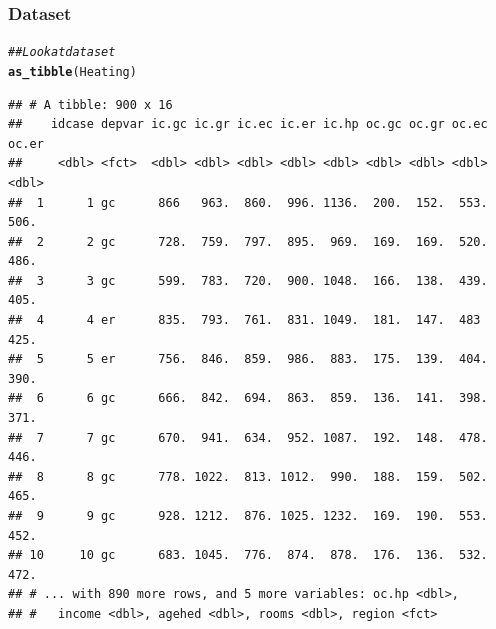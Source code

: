 \documentclass{beamer}\usepackage[]{graphicx}\usepackage[]{color}
\makeatletter
\newcommand{\hlstr}[1]{\textcolor[rgb]{0.192,0.494,0.8}{#1}}%
\newcommand{\hlcom}[1]{\textcolor[rgb]{0.678,0.584,0.686}{\textit{#1}}}%
\newcommand{\hlopt}[1]{\textcolor[rgb]{0,0,0}{#1}}%
\newcommand{\hlstd}[1]{\textcolor[rgb]{0.345,0.345,0.345}{#1}}%
\newcommand{\hlkwb}[1]{\textcolor[rgb]{0.69,0.353,0.396}{#1}}%
\newcommand{\hlkwc}[1]{\textcolor[rgb]{0.333,0.667,0.333}{#1}}%
\newcommand{\hlkwd}[1]{\textcolor[rgb]{0.737,0.353,0.396}{\textbf{#1}}}%
\newenvironment{kframe}{%
 \def\at@end@of@kframe{}%
 \ifinner\ifhmode%
  \def\at@end@of@kframe{\end{minipage}}%
  \begin{minipage}{\columnwidth}%
 \fi\fi%
 \def\FrameCommand##1{\hskip\@totalleftmargin \hskip-\fboxsep
 \colorbox{shadecolor}{##1}\hskip-\fboxsep
     \hskip-\linewidth \hskip-\@totalleftmargin \hskip\columnwidth}%
 \MakeFramed {\advance\hsize-\width
   \@totalleftmargin\z@ \linewidth\hsize
   \@setminipage}}%
 {\par\unskip\endMakeFramed%
 \at@end@of@kframe}
\newenvironment{knitrout}{}{} %
\makeatother
\begin{document}
\begin{frame}[fragile]\frametitle{Dataset}
\begin{knitrout}\footnotesize
{}\color{fgcolor}\begin{kframe}
\begin{alltt}
\hlcom{## Look at dataset}
\hlkwd{as_tibble}\hlstd{(Heating)}
\end{alltt}
\begin{verbatim}
## # A tibble: 900 x 16
##    idcase depvar ic.gc ic.gr ic.ec ic.er ic.hp oc.gc oc.gr oc.ec oc.er
##     <dbl> <fct>  <dbl> <dbl> <dbl> <dbl> <dbl> <dbl> <dbl> <dbl> <dbl>
##  1      1 gc      866   963.  860.  996. 1136.  200.  152.  553.  506.
##  2      2 gc      728.  759.  797.  895.  969.  169.  169.  520.  486.
##  3      3 gc      599.  783.  720.  900. 1048.  166.  138.  439.  405.
##  4      4 er      835.  793.  761.  831. 1049.  181.  147.  483   425.
##  5      5 er      756.  846.  859.  986.  883.  175.  139.  404.  390.
##  6      6 gc      666.  842.  694.  863.  859.  136.  141.  398.  371.
##  7      7 gc      670.  941.  634.  952. 1087.  192.  148.  478.  446.
##  8      8 gc      778. 1022.  813. 1012.  990.  188.  159.  502.  465.
##  9      9 gc      928. 1212.  876. 1025. 1232.  169.  190.  553.  452.
## 10     10 gc      683. 1045.  776.  874.  878.  176.  136.  532.  472.
## # ... with 890 more rows, and 5 more variables: oc.hp <dbl>,
## #   income <dbl>, agehed <dbl>, rooms <dbl>, region <fct>
\end{verbatim}
\end{kframe}
\end{knitrout}
\end{frame}

\end{document}
